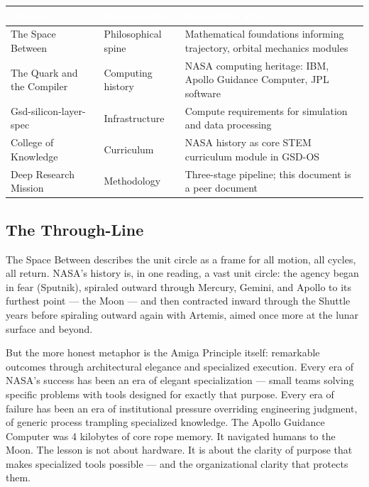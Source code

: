 \documentclass[11pt,letterpaper]{article}
\newcommand{\tableheader}[1]{\textbf{\sffamily\textcolor{white}{#1}}}
\begin{document}
\begin{center}
\begin{tabularx}{\textwidth}{L{4cm}L{3.5cm}X}
\toprule
{}
\tableheader{Document} & \tableheader{Relationship} & \tableheader{Integration Point} \\
\midrule
The Space Between & Philosophical spine & Mathematical foundations informing trajectory, orbital mechanics modules \\
The Quark and the Compiler & Computing history & NASA computing heritage: IBM, Apollo Guidance Computer, JPL software \\
Gsd-silicon-layer-spec & Infrastructure & Compute requirements for simulation and data processing \\
College of Knowledge & Curriculum & NASA history as core STEM curriculum module in GSD-OS \\
Deep Research Mission & Methodology & Three-stage pipeline; this document is a peer document \\
\bottomrule
\end{tabularx}
\end{center}

\subsection{The Through-Line}

The Space Between describes the unit circle as a frame for all motion, all cycles, all return. NASA's history is, in one reading, a vast unit circle: the agency began in fear (Sputnik), spiraled outward through Mercury, Gemini, and Apollo to its furthest point --- the Moon --- and then contracted inward through the Shuttle years before spiraling outward again with Artemis, aimed once more at the lunar surface and beyond.

But the more honest metaphor is the Amiga Principle itself: remarkable outcomes through architectural elegance and specialized execution. Every era of NASA's success has been an era of elegant specialization --- small teams solving specific problems with tools designed for exactly that purpose. Every era of failure has been an era of institutional pressure overriding engineering judgment, of generic process trampling specialized knowledge. The Apollo Guidance Computer was 4 kilobytes of core rope memory. It navigated humans to the Moon. The lesson is not about hardware. It is about the clarity of purpose that makes specialized tools possible --- and the organizational clarity that protects them.
\end{document}
